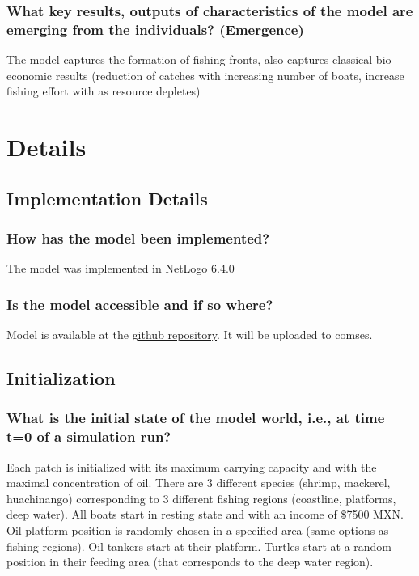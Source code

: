 \documentclass[11pt]{article}
\begin{document}
\subsubsection{What key results, outputs of characteristics of the model are emerging from the individuals? (Emergence)}
\label{sec:org5f1b6e1}
The model captures the formation of fishing fronts, also captures classical bio-economic results (reduction of catches with increasing number of boats, increase fishing effort with as resource depletes)
\section{Details}
\label{sec:org3080d2e}
\subsection{Implementation Details}
\label{sec:org0890f17}
\subsubsection{How has the model been implemented?}
\label{sec:org82ba339}
The model was implemented in NetLogo 6.4.0
\subsubsection{Is the model accessible and if so where?}
\label{sec:orgc490776}
Model is available at the \href{https://github.com/b3m3bi/modelo\_PePe}{github repository}. It will be uploaded to comses.
\subsection{Initialization}
\label{sec:orgf27d41d}
\subsubsection{What is the initial state of the model world, i.e., at time t=0 of a simulation run?}
\label{sec:orgd58d85f}
Each patch is initialized with its maximum carrying capacity and with the maximal concentration of oil. There are 3 different species (shrimp, mackerel, huachinango) corresponding to 3 different fishing regions (coastline, platforms, deep water). All boats start in resting state and with an income of \$7500 MXN. Oil platform position is randomly chosen in a specified area (same options as fishing regions). Oil tankers start at their platform. Turtles start at a random position in their feeding area (that corresponds to the deep water region). 
\end{document}

